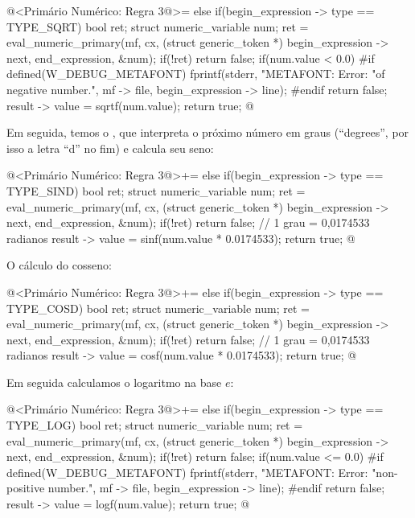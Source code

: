 \iniciocodigo
@<Primário Numérico: Regra 3@>=
else if(begin_expression -> type == TYPE_SQRT){
  bool ret;
  struct numeric_variable num;
  ret = eval_numeric_primary(mf, cx, (struct generic_token *)
                             begin_expression -> next,
                             end_expression, &num);
  if(!ret)
    return false;
  if(num.value < 0.0){
#if defined(W_DEBUG_METAFONT)
    fprintf(stderr, "METAFONT: Error: %
            "of negative number.\n", mf -> file,
            begin_expression -> line);
#endif
    return false;
  }
  result -> value = sqrtf(num.value);
  return true;
}
@
\fimcodigo

Em seguida, temos o , que interpreta o próximo número
em graus (``degrees'', por isso a letra ``d'' no fim) e calcula seu
seno:

\iniciocodigo
@<Primário Numérico: Regra 3@>+=
else if(begin_expression -> type == TYPE_SIND){
  bool ret;
  struct numeric_variable num;
  ret = eval_numeric_primary(mf, cx, (struct generic_token *)
                             begin_expression -> next,
                             end_expression, &num);
  if(!ret)
    return false;
  // 1 grau = 0,0174533 radianos
  result -> value = sinf(num.value * 0.0174533);
  return true;
}
@
\fimcodigo

O cálculo do cosseno:

\iniciocodigo
@<Primário Numérico: Regra 3@>+=
else if(begin_expression -> type == TYPE_COSD){
  bool ret;
  struct numeric_variable num;
  ret = eval_numeric_primary(mf, cx, (struct generic_token *)
                             begin_expression -> next,
                             end_expression, &num);
  if(!ret)
    return false;
  // 1 grau = 0,0174533 radianos
  result -> value = cosf(num.value * 0.0174533);
  return true;
}
@
\fimcodigo

Em seguida calculamos o logaritmo na base $e$:

\iniciocodigo
@<Primário Numérico: Regra 3@>+=
else if(begin_expression -> type == TYPE_LOG){
  bool ret;
  struct numeric_variable num;
  ret = eval_numeric_primary(mf, cx, (struct generic_token *)
                             begin_expression -> next,
                             end_expression, &num);
  if(!ret)
    return false;
  if(num.value <= 0.0){
#if defined(W_DEBUG_METAFONT)
    fprintf(stderr, "METAFONT: Error: %
            "non-positive number.\n", mf -> file,
            begin_expression -> line);
#endif
    return false;
  }
  result -> value = logf(num.value);
  return true;
}
@
\fimcodigo

